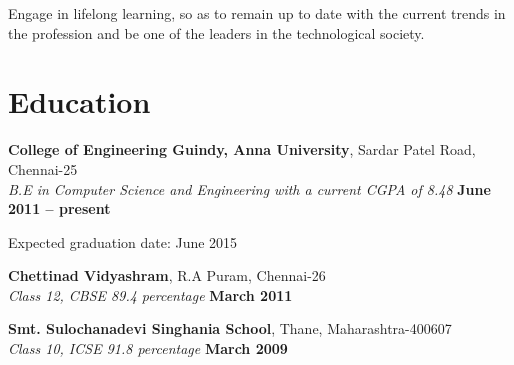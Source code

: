 \documentclass[margin,line]{resume}
\begin{document}
\begin{resume}
Engage in lifelong learning, so as to remain up to date with the current trends in the profession and be one of the leaders in the technological society. 
    \section{\mysidestyle Education}

    \textbf{College of Engineering Guindy, Anna University}, Sardar Patel Road, Chennai-25 \vspace{2mm}\\\vspace{1mm}%
    \textsl{B.E in Computer Science and Engineering with a current CGPA of 8.48} \hfill \textbf{June 2011 -- present}\vspace{-3mm}\vspace{-1mm}%
        \item Expected graduation date: June 2015
    
    \textbf{Chettinad Vidyashram}, R.A Puram, Chennai-26 \vspace{2mm}\\\vspace{1mm}%
    \textsl{Class 12, CBSE 89.4 percentage} \hfill \textbf{March 2011}\vspace{-3mm}\vspace{-1mm}%

    \textbf{Smt. Sulochanadevi Singhania School}, Thane, Maharashtra-400607 \vspace{2mm}\\\vspace{1mm}%
    \textsl{Class 10, ICSE 91.8 percentage} \hfill \textbf{March 2009}\vspace{-3mm}\\\vspace{-1mm}%

\end{resume}
\end{document}
